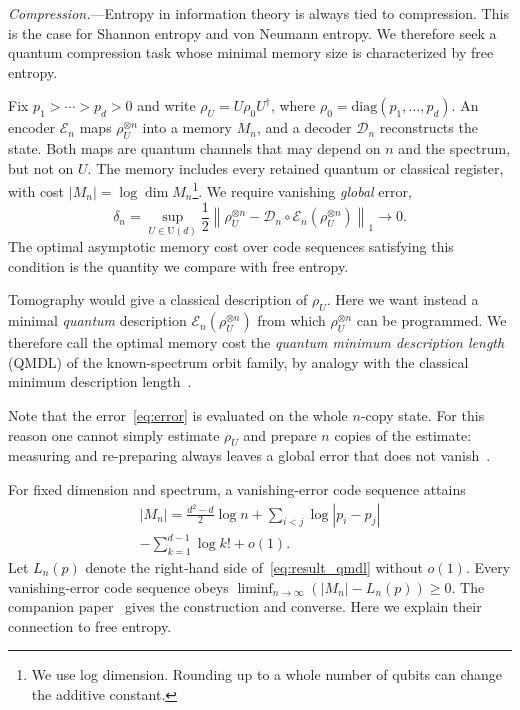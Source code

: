 \documentclass[aps,prl,twocolumn,superscriptaddress,amsmath,amssymb,reprint,longbibliography]{revtex4-2}
\def\D{\mathcal{D}}
\def\E{\mathcal{E}}
\begin{document}
\emph{Compression.}---Entropy in information theory is always tied to compression. This is the case for Shannon entropy and von Neumann entropy. We therefore seek a quantum compression task whose minimal memory size is characterized by free entropy.

Fix $p_1>\cdots>p_d>0$ and write $\rho_U=U\rho_0U^\dagger$, where $\rho_0=\mathrm{diag}(p_1,\ldots,p_d)$.
An encoder $\E_n$ maps $\rho_U^{\otimes n}$ into a memory $M_n$, and a decoder $\D_n$ reconstructs the state. Both maps are quantum channels that may depend on $n$ and the spectrum, but not on $U$. The memory includes every retained quantum or classical register, with cost $|M_n|=\log\dim M_n$\footnote{We use log dimension. Rounding up to a whole number of qubits can change the additive constant.}. We require vanishing \emph{global} error,
\begin{equation}\label{eq:error}
    \delta_n=\sup_{U\in\mathrm U(d)}\frac12
    \left\|\rho_U^{\otimes n}-\D_n\circ\E_n(\rho_U^{\otimes n})\right\|_1
    \longrightarrow0.
\end{equation}
The optimal asymptotic memory cost over code sequences satisfying this condition is the quantity we compare with free entropy.

Tomography would give a classical description of $\rho_U$. Here we want instead a minimal \emph{quantum} description $\E_n(\rho_U^{\otimes n})$ from which $\rho_U^{\otimes n}$ can be programmed. We therefore call the optimal memory cost the \emph{quantum minimum description length} (QMDL) of the known-spectrum orbit family, by analogy with the classical minimum description length~\cite{rissanen1978modeling}.

Note that the error~\eqref{eq:error} is evaluated on the whole $n$-copy state. For this reason one cannot simply estimate $\rho_U$ and prepare $n$ copies of the estimate: measuring and re-preparing always leaves a global error that does not vanish~\cite{yang2018compression}.



For fixed dimension and spectrum, a vanishing-error code sequence attains
\begin{multline}\label{eq:result_qmdl}
    |M_n|=\frac{d^2-d}{2}\log n+\sum_{i<j}\log|p_i-p_j|\\
    -\sum_{k=1}^{d-1}\log k!+o(1).
\end{multline}
Let $L_n(p)$ denote the right-hand side of~\eqref{eq:result_qmdl} without $o(1)$. Every vanishing-error code sequence obeys $\liminf_{n\to\infty}(|M_n|-L_n(p))\ge0$. The companion paper~\cite{paper2} gives the construction and converse. Here we explain their connection to free entropy.
\end{document}
